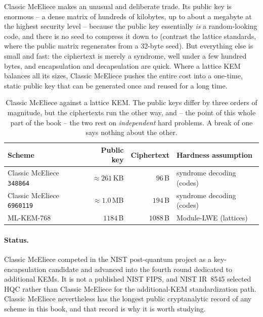 Classic McEliece makes an unusual and deliberate trade. Its public key is enormous -- a dense matrix of hundreds of kilobytes, up to about a megabyte at the highest security level -- because the public key essentially \emph{is} a random-looking code, and there is no seed to compress it down to (contrast the lattice standards, where the public matrix regenerates from a 32-byte seed). But everything else is small and fast: the ciphertext is merely a syndrome, well under a few hundred bytes, and encapsulation and decapsulation are quick. Where a lattice KEM balances all its sizes, Classic McEliece pushes the entire cost into a one-time, static public key that can be generated once and reused for a long time.

\begin{table}[H]
\centering
\begin{tabular}{lrrl}
\toprule
Scheme & Public key & Ciphertext & Hardness assumption \\
\midrule
Classic McEliece \texttt{348864}  & $\approx 261$\,KB & $96$\,B  & syndrome decoding (codes) \\
Classic McEliece \texttt{6960119} & $\approx 1.0$\,MB & $194$\,B & syndrome decoding (codes) \\
ML-KEM-768                        & $1184$\,B          & $1088$\,B & Module-LWE (lattices) \\
\bottomrule
\end{tabular}
\caption{Classic McEliece against a lattice KEM. The public keys differ by three orders of magnitude, but the ciphertexts run the other way, and -- the point of this whole part of the book -- the two rest on \emph{independent} hard problems. A break of one says nothing about the other.}
\label{tab:mce-vs-mlkem}
\end{table}

\paragraph{Status.}
Classic McEliece competed in the NIST post-quantum project as a key-encapsulation candidate and advanced into the fourth round dedicated to additional KEMs. It is not a published NIST FIPS, and NIST IR~8545 selected HQC rather than Classic McEliece for the additional-KEM standardization path. Classic McEliece nevertheless has the longest public cryptanalytic record of any scheme in this book, and that record is why it is worth studying.

